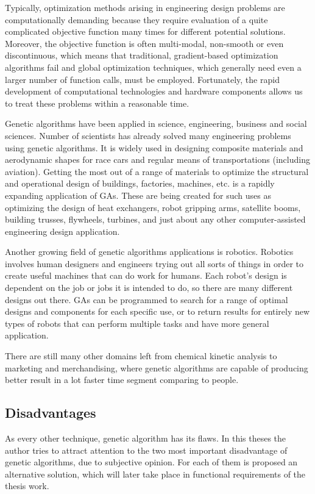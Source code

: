 Typically, optimization methods arising in engineering design problems are computationally demanding because they require evaluation of a quite complicated objective function many times for different potential solutions. Moreover, the objective function is often multi-modal, non-smooth or even discontinuous, which means that traditional, gradient-based optimization algorithms fail and global optimization techniques, which generally need even a larger number of function calls, must be employed. Fortunately, the rapid development of computational technologies and hardware components allows us to treat these problems within a reasonable time.

Genetic algorithms have been applied in science, engineering, business and social sciences. Number of scientists has already solved many engineering problems using genetic algorithms. It is widely used in designing composite materials and aerodynamic shapes for race cars and regular means of transportations (including aviation). Getting the most out of a range of materials to optimize the structural and operational design of buildings, factories, machines, etc. is a rapidly expanding application of GAs. These are being created for such uses as optimizing the design of heat exchangers, robot gripping arms, satellite booms, building trusses, flywheels, turbines, and just about any other computer-assisted engineering design application. 

Another growing field of genetic algorithms applications is robotics. Robotics involves human designers and engineers trying out all sorts of things in order to create useful machines that can do work for humans. Each robot’s design is dependent on the job or jobs it is intended to do, so there are many different designs out there. GAs can be programmed to search for a range of optimal designs and components for each specific use, or to return results for entirely new types of robots that can perform multiple tasks and have more general application.

There are still many other domains left from chemical kinetic analysis to marketing and merchandising, where genetic algorithms are capable of producing better result in a lot faster time segment comparing to people.

\subsection{Disadvantages}
As every other technique, genetic algorithm has its flaws. In this theses the author tries to attract attention to the two most important disadvantage of genetic algorithms, due to subjective opinion. For each of them is proposed an alternative solution, which will later take place in functional requirements of the thesis work.

